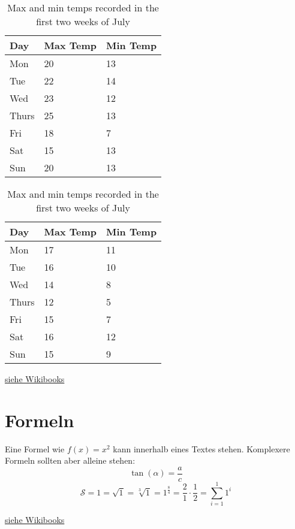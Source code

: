 \begin{table}[ht]
    \begin{subtable}[ht]{0.45\textwidth}
        \centering
        \begin{tabular}{l | l | l}
        Day & Max Temp & Min Temp \\
        \hline \hline
        Mon & 20 & 13\\
        Tue & 22 & 14\\
        Wed & 23 & 12\\
        Thurs & 25 & 13\\
        Fri & 18 & 7\\
        Sat & 15 & 13\\
        Sun & 20 & 13
        \end{tabular}
        \caption{First Week}
        \label{tab:week1}
    \end{subtable}
    \hfill
    \begin{subtable}[ht]{0.45\textwidth}
        \centering
        \begin{tabular}{l | l | l}
        Day & Max Temp & Min Temp \\
        \hline \hline
        Mon & 17 & 11\\
        Tue & 16 & 10\\
        Wed & 14 & 8\\
        Thurs & 12 & 5\\
        Fri & 15 & 7\\
        Sat & 16 & 12\\
        Sun & 15 & 9
        \end{tabular}
        \caption{Second Week}
        \label{tab:week2}
    \end{subtable}
    \caption{Max and min temps recorded in the first two weeks of July}
    \label{tab:temps}
\end{table}

\href{https://en.wikibooks.org/wiki/LaTeX/Tables}{siehe Wikibooks}

\section{Formeln}
Eine Formel wie \( f(x)=x^2 \) kann innerhalb eines Textes stehen.
Komplexere Formeln sollten aber alleine stehen:
\[
  \tan (\alpha) = \frac{a}{c}
\]
\[
  \mathcal S=1=\sqrt{1}=\sqrt[3]{1}=1^{\frac{8}{4}}=\frac{2}{1}\cdot\frac{1}{2}
  = \sum_{i=1}^{1} 1^i
\]

\href{https://en.wikibooks.org/wiki/LaTeX/Mathematics}{siehe Wikibooks}
